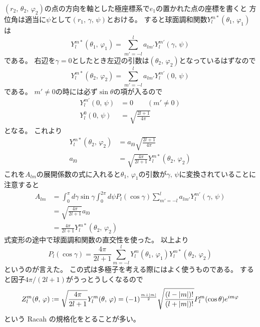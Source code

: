 \documentclass[../../master.tex]{subfiles}
\begin{document}
\((r_2,\,\theta_2,\,\varphi_2)\)の点の方向を軸とした極座標系で\(e_1\)の置かれた点の座標を書くと
方位角は適当に\(\psi\)として\((r_1,\,\gamma,\,\psi)\)とおける。
すると球面調和関数\(Y_l^{m*}(\theta_1,\,\varphi_1)\)は
\begin{equation}
	Y_l^{m*}(\theta_1,\,\varphi_1) = \sum_{m'=-l}^{l} a_{lm'}Y_l^{m'}(\gamma,\,\psi)
\end{equation}
である。
右辺を\(\gamma=0\)としたとき左辺の引数は\((\theta_2,\,\varphi_2)\)となっているはずなので
\begin{equation}
	Y_l^{m*}(\theta_2,\,\varphi_2) = \sum_{m'=-l}^{l} a_{lm'}Y_l^{m'}(0,\,\psi)
\end{equation}
である。
\(m'\neq0\)の時には必ず\(\sin\theta\)の項が入るので
\begin{align}
	Y_l^{m'}(0,\,\psi) &= 0 \qquad (m'\neq 0) \\
	Y_l^{0}(0,\,\psi) &= \sqrt{\frac{2l+1}{4\pi}}
\end{align}
となる。
これより
\begin{align}
	Y_l^{m*}(\theta_2,\,\varphi_2) &= a_{l0}\sqrt{\frac{2l+1}{4\pi}}\\
	a_{l0}& = \sqrt{\frac{4\pi}{2l+1}} Y_l^{m*}(\theta_2,\,\varphi_2)
\end{align}
これを\(A_{lm}\)の展開係数の式に入れると\(\theta_1,\,\varphi_1\)の引数が\(\gamma,\,\psi\)に変換されていることに注意すると
\begin{align}
	A_{lm} &=\int_{0}^{\pi} d\gamma \sin\gamma \int_{0}^{2\pi} d\psi
	P_l(\cos\gamma)\sum_{m'=-l}^{l}a_{lm'}Y_l^{m'}(\gamma,\,\psi)\\
	&=\sqrt{\frac{4\pi}{2l+1}}a_{l0}\\
	&=\frac{4\pi}{2l+1}Y_l^{m*}(\theta_2,\,\varphi_2)
\end{align}
式変形の途中で球面調和関数の直交性を使った。
以上より
\begin{equation}
	P_l(\cos\gamma) = \frac{4\pi}{2l+1}\sum_{m=-l}^{l} Y_l^m(\theta_1,\,\varphi_1) Y_l^{m*}(\theta_2,\,\varphi_2)
\end{equation}
というのが言えた。
この式は多極子を考える際にはよく使うものである。
すると因子\(4\pi/(2l+1)\)がうっとうしくなるので
\begin{equation}
	Z_l^m(\theta,\,\varphi) := \sqrt{\frac{4\pi}{2l+1}} Y_l^m(\theta,\,\varphi)
	= (-1)^{\frac{m+\abs{m}}{2}}\sqrt{\frac{(l-\abs{m})!}{(l+\abs{m})!}}P_l^m(\cos\theta)e^{im\varphi}
\end{equation}
という Racah の規格化をとることが多い。
\end{document}
